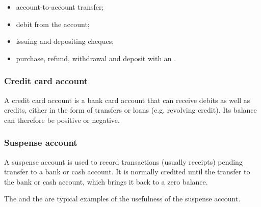 \begin{itemize}
	\item account-to-account transfer;
	\item debit from the account;
	\item issuing and depositing cheques;
	\item purchase, refund, withdrawal and deposit with an .
\end{itemize}


\subsubsection{Credit card account\label{accounts-type-bank-creditcard}}

A credit card account is a bank card account that can receive debits as well as credits, either in the form of transfers or loans (e.g. revolving credit). Its balance can therefore be positive or negative.


\subsubsection{Suspense account\label{accounts-type-bank-waiting}}

A suspense account is used to record transactions (usually receipts) pending transfer to a bank or cash account. It is normally credited until the transfer to the bank or cash account, which brings it back to a zero balance.

The  and the  are typical examples of the usefulness of the suspense account.

